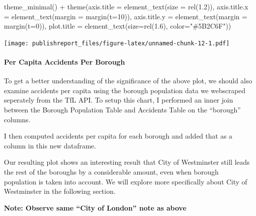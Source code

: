 \documentclass[
]{article}
\newenvironment{Shaded}{\begin{snugshade}}{\end{snugshade}}
\newcommand{\AttributeTok}[1]{\textcolor[rgb]{0.77,0.63,0.00}{#1}}
\newcommand{\DecValTok}[1]{\textcolor[rgb]{0.00,0.00,0.81}{#1}}
\newcommand{\FloatTok}[1]{\textcolor[rgb]{0.00,0.00,0.81}{#1}}
\newcommand{\FunctionTok}[1]{\textcolor[rgb]{0.00,0.00,0.00}{#1}}
\newcommand{\NormalTok}[1]{#1}
\newcommand{\SpecialCharTok}[1]{\textcolor[rgb]{0.00,0.00,0.00}{#1}}
\newcommand{\StringTok}[1]{\textcolor[rgb]{0.31,0.60,0.02}{#1}}
\begin{document}
\begin{Shaded}
\begin{Highlighting}[]
    \FunctionTok{theme\_minimal}\NormalTok{() }\SpecialCharTok{+}
    \FunctionTok{theme}\NormalTok{(}\AttributeTok{axis.title =} \FunctionTok{element\_text}\NormalTok{(}\AttributeTok{size =} \FunctionTok{rel}\NormalTok{(}\FloatTok{1.2}\NormalTok{)),}
          \AttributeTok{axis.title.x =} \FunctionTok{element\_text}\NormalTok{(}\AttributeTok{margin =} \FunctionTok{margin}\NormalTok{(}\AttributeTok{t=}\DecValTok{10}\NormalTok{)),}
          \AttributeTok{axis.title.y =} \FunctionTok{element\_text}\NormalTok{(}\AttributeTok{margin =} \FunctionTok{margin}\NormalTok{(}\AttributeTok{t=}\DecValTok{0}\NormalTok{)),}
          \AttributeTok{plot.title =} \FunctionTok{element\_text}\NormalTok{(}\AttributeTok{size=}\FunctionTok{rel}\NormalTok{(}\FloatTok{1.6}\NormalTok{), }\AttributeTok{color=}\StringTok{"\#5B2C6F"}\NormalTok{))}
\end{Highlighting}
\end{Shaded}

\texttt{[image: publishreport\_files/figure-latex/unnamed-chunk-12-1.pdf]}

\hypertarget{per-capita-accidents-per-borough}{%
\paragraph{Per Capita Accidents Per
Borough}\label{per-capita-accidents-per-borough}}

To get a better understanding of the significance of the above plot, we
should also examine accidents per capita using the borough population
data we webscraped seperately from the TfL API. To setup this chart, I
performed an inner join between the Borough Population Table and
Accidents Table on the ``borough'' columns.

I then computed accidents per capita for each borough and added that as
a column in this new dataframe.

Our resulting plot shows an interesting result that City of Westminster
still leads the rest of the boroughs by a considerable amount, even when
borough population is taken into account. We will explore more
specifically about City of Westminster in the following section.

\textbf{Note: Observe same ``City of London'' note as above}
\end{document}
